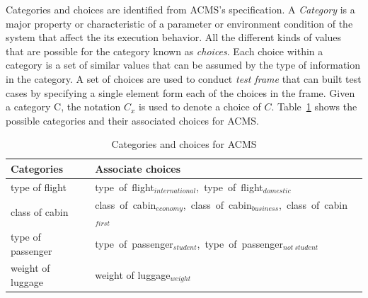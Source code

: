 \documentclass[10pt,journal,compsoc]{IEEEtran}
\begin{document}
Categories and choices are identified from ACMS's specification. A \emph{Category} is a major property or characteristic of a parameter or environment condition of the system that affect the its execution behavior. All the different kinds of values that are possible for the category known as \emph{choices}. Each choice within a category is a set of similar values that can be assumed by the type of information in the category. A set of choices are used to conduct \emph{test frame} that can built test cases by specifying a single element form each of the choices in the frame. Given a category C, the notation $C_x$ is used to denote a choice of $C$. Table~\ref{table:categoryAndchoice} shows the possible categories and their associated choices for ACMS.
\begin{table}
  \caption{Categories and choices for ACMS}
  \label{table:categoryAndchoice}
  \centering
  \begin{tabular}{ll}
  \toprule
  Categories                   &Associate choices \\
  \midrule
  type of flight               &type~of~flight$_{international}$,~type~of~flight$_{domestic}$ \\
  class of cabin               &class~of~cabin$_{economy}$,~class~of~cabin$_{business}$,~class~of~cabin$_{first}$ \\
  type of passenger            &type~of~passenger$_{student}$,~type~of~passenger$_{not~student}$ \\
  weight of luggage            &weight of luggage$_{weight}$ \\
  \bottomrule 
  \end{tabular}
\end{table}
\end{document}
